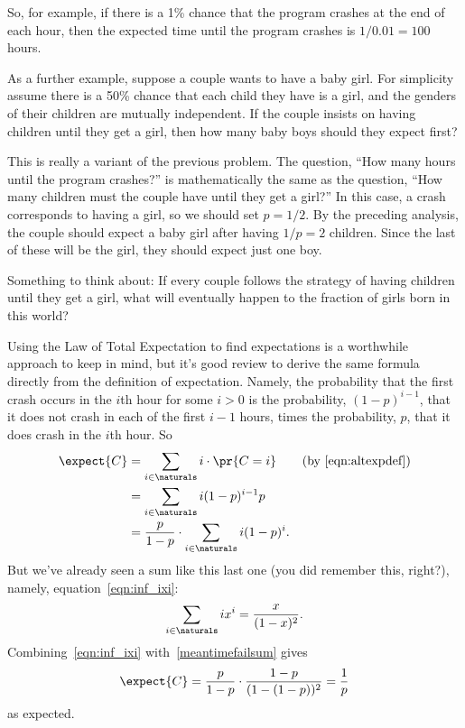 So, for example, if there is a 1\% chance that the program crashes at
the end of each hour, then the expected time until the program crashes
is $1 / 0.01 = 100$ hours.  

As a further example, suppose a couple wants to have a baby girl.
For simplicity assume there is a 50\% chance that each child they have
is a girl, and the genders of their children are mutually independent.
If the couple insists on having children until they get a girl, then
how many baby boys should they expect first?

This is really a variant of the previous problem.  The question, ``How
many hours until the program crashes?'' is mathematically the same as
the question, ``How many children must the couple have until they get
a girl?''  In this case, a crash corresponds to having a girl, so we
should set $p = 1/2$.  By the preceding analysis, the couple
should expect a baby girl after having $1/p = 2$ children.  Since the
last of these will be the girl, they should expect just one boy.

Something to think about: If every couple follows the strategy of having
children until they get a girl, what will eventually happen to the
fraction of girls born in this world?

Using the Law of Total Expectation to find expectations is a worthwhile
approach to keep in mind, but it's good review to derive the same
formula directly from the definition of expectation.  Namely, the
probability that the first crash occurs in the $i$th hour for some $i
>0$ is the probability, $(1-p)^{i-1}$, that it does not crash in each
of the first $i-1$ hours, times the probability, $p$, that it does
crash in the $i$th hour.  So
\begin{align}
\expect{C} & = \sum_{i \in \naturals} i \cdot \pr{C=i}
               & \text{(by~\eqref{eqn:altexpdef})}\notag\\
           & = \sum_{i \in \naturals} i (1-p)^{i-1}p\notag\\
           &= \frac{p}{1-p} \cdot \sum_{i \in \naturals} i (1-p)^i.\label{meantimefailsum}
\end{align}
But we've already seen a sum like this last one (you did remember
this, right?), namely, equation~\eqref{eqn:inf_ixi}:
\[
\sum_{i \in \naturals} ix^i =\frac{x}{(1-x)^2}.
\]
Combining~\eqref{eqn:inf_ixi} with~\eqref{meantimefailsum} gives
\[
\expect{C} = \frac{p}{1-p} \cdot \frac{1-p}{(1-(1-p))^2} = \frac{1}{p}
\]
as expected.

